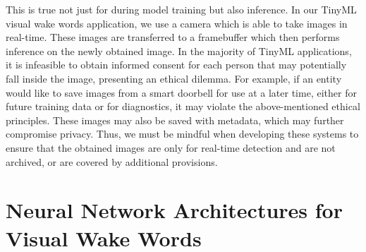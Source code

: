   This is true not just for during model training but also inference. In our TinyML visual wake words application, we use a camera which is able to take images in real-time. These images are transferred to a framebuffer which then performs inference on the newly obtained image. In the majority of TinyML applications, it is infeasible to obtain informed consent for each person that may potentially fall inside the image, presenting an ethical dilemma. For example, if an entity would like to save images from a smart doorbell for use at a later time, either for future training data or for diagnostics, it may violate the above-mentioned ethical principles. These images may also be saved with metadata, which may further compromise privacy. Thus, we must be mindful when developing these systems to ensure that the obtained images are only for real-time detection and are not archived, or are covered by additional provisions.
  
\section{Neural Network Architectures for Visual Wake Words}

